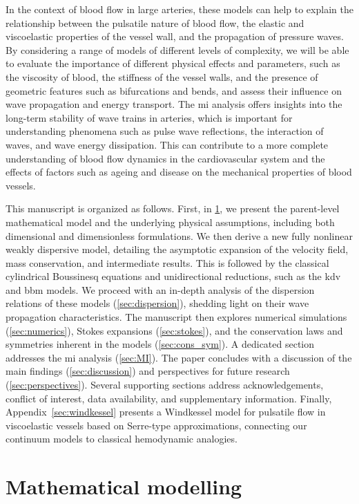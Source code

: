 \documentclass[alpha-refs, 12pt]{wiley-article}
\begin{document}
In the context of blood flow in large arteries, these models can help to explain the relationship between the pulsatile nature of blood flow, the elastic and viscoelastic properties of the vessel wall, and the propagation of pressure waves. By considering a range of models of different levels of complexity, we will be able to evaluate the importance of different physical effects and parameters, such as the viscosity of blood, the stiffness of the vessel walls, and the presence of geometric features such as bifurcations and bends, and assess their influence on wave propagation and energy transport. The \acrshort{mi} analysis offers insights into the long-term stability of wave trains in arteries, which is important for understanding phenomena such as pulse wave reflections, the interaction of waves, and wave energy dissipation. This can contribute to a more complete understanding of blood flow dynamics in the cardiovascular system and the effects of factors such as ageing and disease on the mechanical properties of blood vessels.

This manuscript is organized as follows. First, in \cref{sec:model}, we present the parent-level mathematical model and the underlying physical assumptions, including both dimensional and dimensionless formulations. We then derive a new fully nonlinear weakly dispersive model, detailing the asymptotic expansion of the velocity field, mass conservation, and intermediate results. This is followed by the classical cylindrical Boussinesq equations and unidirectional reductions, such as the \acrfull{kdv} and \acrfull{bbm} models. We proceed with an in-depth analysis of the dispersion relations of these models (\cref{sec:dispersion}), shedding light on their wave propagation characteristics. The manuscript then explores numerical simulations (\cref{sec:numerics}), Stokes expansions (\cref{sec:stokes}), and the conservation laws and symmetries inherent in the models (\cref{sec:cons_sym}). A dedicated section addresses the \acrshort{mi} analysis (\cref{sec:MI}). The paper concludes with a discussion of the main findings (\cref{sec:discussion}) and perspectives for future research (\cref{sec:perspectives}). Several supporting sections address acknowledgements, conflict of interest, data availability, and supplementary information. Finally, Appendix~\ref{sec:windkessel} presents a Windkessel model for pulsatile flow in viscoelastic vessels based on Serre-type approximations, connecting our continuum models to classical hemodynamic analogies.

\section{Mathematical modelling}
\label{sec:model}
\end{document}
